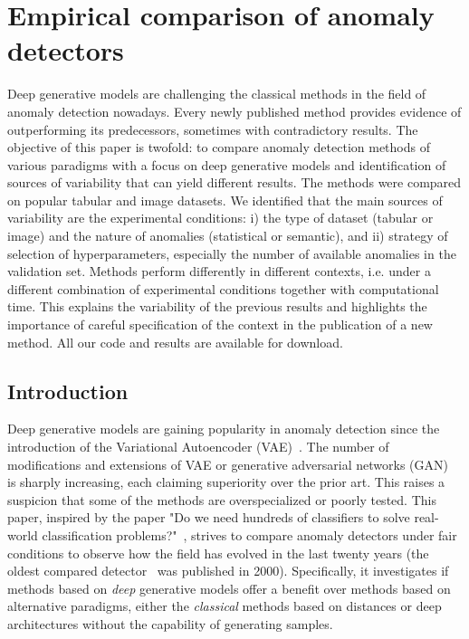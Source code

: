\chapter{Empirical comparison of anomaly detectors} \label{sec:chapter_comparison}

Deep generative models are challenging the classical methods in the field of anomaly detection nowadays. Every newly published method provides evidence of outperforming its predecessors, sometimes with contradictory results. The objective of this paper is twofold: to compare anomaly detection methods of various paradigms with a focus on deep generative models and identification of sources of variability that can yield different results. The methods were compared on popular tabular and image datasets. We identified that the main sources of variability are the experimental conditions: i) the type of dataset (tabular or image) and the nature of anomalies (statistical or semantic), and ii) strategy of selection of hyperparameters, especially the number of available anomalies in the validation set. Methods perform differently in different contexts, i.e. under a different combination of experimental conditions together with computational time. This explains the variability of the previous results and highlights the importance of careful specification of the context in the publication of a new method. All our code and results are available for download.

\section{Introduction}
Deep generative models are gaining popularity in anomaly detection since the introduction of the Variational Autoencoder (VAE)~\cite{kingma2013auto}. The number of modifications and extensions of VAE or generative adversarial networks (GAN)~\cite{goodfellow2014generative} is sharply increasing, each claiming superiority over the prior art. This raises a suspicion that some of the methods are overspecialized or poorly tested. This paper, inspired by the paper "Do we need hundreds of classifiers to solve real-world classification problems?"~\cite{fernandez2014we}, strives to compare anomaly detectors under fair conditions to observe how the field has evolved in the last twenty years (the oldest compared detector~\cite{ramaswamy2000efficient} was published in 2000). Specifically, it investigates if methods based on \textit{deep} generative models offer a benefit over methods based on alternative paradigms, either the \textit{classical} methods based on distances or deep architectures without the capability of generating samples.

